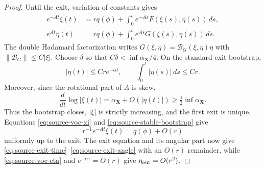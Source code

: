 \documentclass[11pt]{amsart}
\numberwithin{equation}{section}
\theoremstyle{definition}
\theoremstyle{remark}
\begin{document}
\begin{proof}
Until the exit, variation of constants gives
\begin{align}
 e^{-A t}\xi(t)
  &=r q(\phi)+\int_0^t e^{-As}F(\xi(s),\eta(s))\,ds,
       \label{eq:source-voc-xi}\\
 e^{A t}\eta(t)
  &=r q(\phi)+\int_0^t e^{As}G(\xi(s),\eta(s))\,ds.
       \label{eq:source-voc-eta}
\end{align}
The double Hadamard factorization writes
$G(\xi,\eta)=\mathcal B_G(\xi,\eta)\eta$ with
$\|\mathcal B_G\|\le C|\xi|$.  Choose $\delta$ so that
$C\delta<\inf\alpha_{\mathbf X}/4$.  On the standard exit bootstrap,
\begin{equation}\label{eq:source-stable-bootstrap}
 |\eta(t)|\le C r e^{-\alpha t},\qquad
 \int_0^t|\eta(s)|\,ds\le Cr.
\end{equation}
Moreover, since the rotational part of $A$ is skew,
\begin{equation}\label{eq:source-radial-speed}
 \frac d{dt}\log|\xi(t)|
  =\alpha_{\mathbf X}+O(|\eta(t)|)
  \ge\tfrac12\inf\alpha_{\mathbf X}.
\end{equation}
Thus the bootstrap closes, $|\xi|$ is strictly increasing, and the first
exit is unique.  Equations \eqref{eq:source-voc-xi} and
\eqref{eq:source-stable-bootstrap} give
\begin{equation}\label{eq:source-normalized-xi}
 r^{-1}e^{-At}\xi(t)=q(\phi)+O(r)
\end{equation}
uniformly up to the exit.  The exit equation and its angular part now give
\eqref{eq:source-exit-time}--\eqref{eq:source-exit-angle} with an $O(r)$
remainder, while \eqref{eq:source-voc-eta} and
$e^{-\alpha\tau}=O(r)$ give $\eta_{\rm out}=O(r^2)$.


\end{proof}
\end{document}
